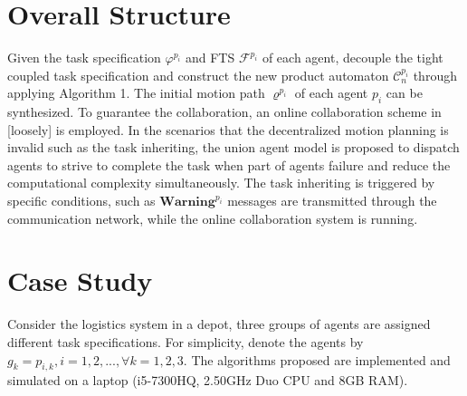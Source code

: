 \documentclass[journal]{IEEEtran}
\begin{document}
\section{Overall Structure}
Given the task specification $\varphi^{p_i}$ and FTS $\mathcal{F}^{p_i}$ of each agent, decouple the tight coupled task specification and construct the new product automaton $\mathcal{C}^{p_i}_n$ through applying Algorithm 1. The initial motion path $\varrho^{p_i}$ of each agent $p_i$ can be synthesized. To guarantee the collaboration, an online collaboration scheme in [loosely] is employed. In the scenarios that the decentralized motion planning is invalid such as the task inheriting, the union agent model is proposed to dispatch agents to strive to complete the task when part of agents failure and reduce the computational complexity simultaneously. The task inheriting is triggered by specific conditions, such as $\textbf{Warning}^{p_i}$ messages are transmitted through the communication network, while the online collaboration system is running.
\section{Case Study}
Consider the logistics system in a depot, three groups of agents are assigned different task specifications. For simplicity, denote the agents by $g_k={p_{i,k},i=1,2,...},\forall k=1,2,3$. The algorithms proposed are implemented and simulated on a laptop (i5-7300HQ, 2.50GHz Duo CPU and 8GB RAM).
\end{document}
